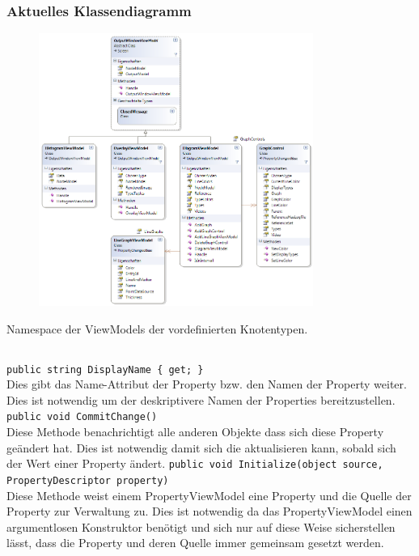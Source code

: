 \subsubsection*{Aktuelles Klassendiagramm}
\begin{figure}[h!]
\begin{center}
\includegraphics[width=0.8\textwidth]{classdiagram/viewmodel-imp.png}
\end{center}
\end{figure}
Namespace der ViewModels der vordefinierten Knotentypen.
\newpage

\subsection{}

\paragraph{}
\begin{itemize}
	\add \verb!public string DisplayName { get; }! \\
	Dies gibt das Name-Attribut der Property bzw. den Namen der Property weiter. Dies ist notwendig um der  deskriptivere Namen der Properties bereitzustellen.
	\add \verb!public void CommitChange()! \\
	Diese Methode benachrichtigt alle anderen Objekte dass sich diese Property geändert hat. Dies ist notwendig damit sich die  aktualisieren kann, sobald sich der Wert einer Property ändert.
	\add \verb!public void Initialize(object source, PropertyDescriptor property)! \\
	Diese Methode weist einem PropertyViewModel eine Property und die Quelle der Property zur Verwaltung zu. Dies ist notwendig da das PropertyViewModel einen argumentlosen Konstruktor benötigt und sich nur auf diese Weise sicherstellen lässt, dass die Property und deren Quelle immer gemeinsam gesetzt werden.
\end{itemize}

